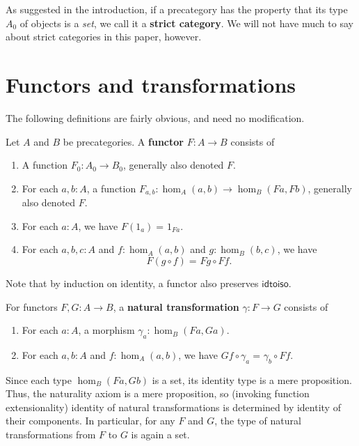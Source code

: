 \documentclass{amsart}
\newcommand{\id}[3][]{\ensuremath{#2 =_{#1} #3}\xspace}
\theoremstyle{definition}
\theoremstyle{remark}
\numberwithin{equation}{section}
\newcommand{\idtoiso}{\ensuremath{\mathsf{idtoiso}}\xspace}
\begin{document}
\begin{rmk}\label{defn:strict}
  As suggested in the introduction, if a precategory has the property that its type $A_0$ of objects is a \emph{set}, we call it a \textbf{strict category}.
  We will not have much to say about strict categories in this paper, however.
\end{rmk}


\section{Functors and transformations}
\label{sec:transfors}

The following definitions are fairly obvious, and need no modification.

\begin{defn}\label{ct:functor}
  Let $A$ and $B$ be precategories.
  A \textbf{functor} $F:A\to B$ consists of
  \begin{enumerate}
  \item A function $F_0:A_0\to B_0$, generally also denoted $F$.
  \item For each $a,b:A$, a function $F_{a,b}:\hom_A(a,b) \to \hom_B(Fa,Fb)$, generally also denoted $F$.
  \item For each $a:A$, we have $\id{F(1_a)}{1_{Fa}}$.
  \item For each $a,b,c:A$ and $f:\hom_A(a,b)$ and $g:\hom_B(b,c)$, we have
    \[\id{F(g\circ f)}{Fg\circ Ff}.\]
  \end{enumerate}
\end{defn}

Note that by induction on identity, a functor also preserves \idtoiso.

\begin{defn}\label{ct:nattrans}
  For functors $F,G:A\to B$, a \textbf{natural transformation} $\gamma:F\to G$ consists of
  \begin{enumerate}
  \item For each $a:A$, a morphism $\gamma_a:\hom_B(Fa,Ga)$.
  \item For each $a,b:A$ and $f:\hom_A(a,b)$, we have $\id{Gf\circ \gamma_a}{\gamma_b\circ Ff}$.
  \end{enumerate}
\end{defn}

Since each type $\hom_B(Fa,Gb)$ is a set, its identity type is a mere proposition.
Thus, the naturality axiom is a mere proposition, so (invoking function extensionality) identity of natural transformations is determined by identity of their components.
In particular, for any $F$ and $G$, the type of natural transformations from $F$ to $G$ is again a set.
\end{document}
